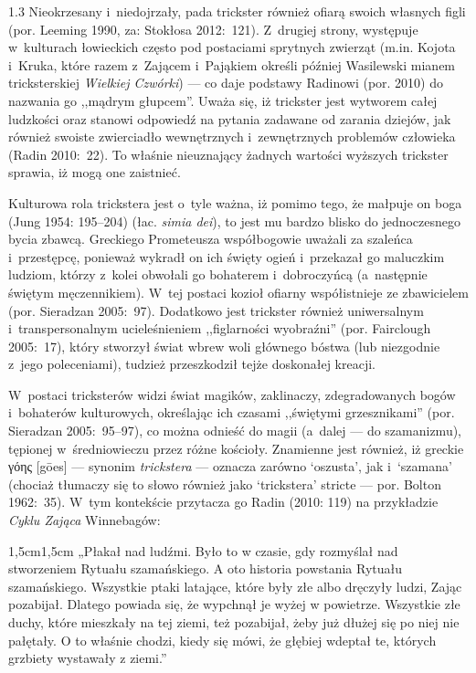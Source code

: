 \documentclass[11pt,a4paper,twoside]{report}
\begin{document}
\begin{spacing}{1.3}
Nieokrzesany i~niedojrzały, pada trickster również ofiarą swoich własnych figli (por. Leeming 1990, za: Stokłosa 2012:~121). Z~drugiej strony, występuje w~kulturach łowieckich często pod postaciami sprytnych zwierząt (m.in. Kojota i~Kruka, które razem z~Zającem i~Pająkiem określi później Wasilewski mianem tricksterskiej \emph{Wielkiej Czwórki}) --- co daje podstawy Radinowi (por. 2010) do nazwania go ,,mądrym głupcem''. Uważa się, iż trickster jest wytworem całej ludzkości oraz stanowi odpowiedź na pytania zadawane od zarania dziejów, jak również swoiste zwierciadło wewnętrznych i~zewnętrznych problemów człowieka (Radin 2010:~22). To właśnie nieuznający żadnych wartości wyższych trickster sprawia, iż mogą one zaistnieć.

Kulturowa rola trickstera jest o~tyle ważna, iż pomimo tego, że małpuje on boga (Jung 1954: 195--204) (łac. \emph{simia dei}), to jest mu bardzo blisko do jednoczesnego bycia zbawcą. Greckiego Prometeusza współbogowie uważali za szaleńca i~przestępcę, ponieważ wykradł on ich święty ogień i~przekazał go maluczkim ludziom, którzy z~kolei obwołali go bohaterem i~dobroczyńcą (a~następnie świętym męczennikiem). W~tej postaci kozioł ofiarny współistnieje ze zbawicielem (por. Sieradzan 2005:~97). Dodatkowo jest trickster również uniwersalnym i~transpersonalnym ucieleśnieniem ,,figlarności wyobraźni'' (por. Fairclough 2005:~17), który stworzył świat wbrew woli głównego bóstwa (lub niezgodnie z~jego poleceniami), tudzież przeszkodził tejże doskonałej kreacji.

W~postaci tricksterów widzi świat magików, zaklinaczy, zdegradowanych bogów i~bohaterów kulturowych, określając ich czasami ,,świętymi grzesznikami'' (por. Sieradzan 2005:~95--97), co można odnieść do magii (a~dalej --- do szamanizmu), tępionej w~średniowieczu przez różne kościoły. Znamienne jest również, iż greckie \textgreek{γόης} [g\={o}es] --- synonim \emph{trickstera} --- oznacza zarówno ‘oszusta’, jak i~‘szamana’ (chociaż tłumaczy się to słowo również jako ‘trickstera’ stricte --- por. Bolton 1962:~35). W~tym kontekście przytacza go Radin (2010: 119) na przykładzie \emph{Cyklu Zająca} Winnebagów:
\end{spacing}
\pagebreak
\begin{adjustwidth}{1,5cm}{1,5cm}
\small{
„Płakał nad ludźmi. Było to w czasie, gdy rozmyślał nad stworzeniem Rytuału szamańskiego. A oto historia powstania Rytuału szamańskiego. Wszystkie ptaki latające, które były złe albo dręczyły ludzi, Zając pozabijał. Dlatego powiada się, że wypchnął je wyżej w powietrze. Wszystkie złe duchy, które mieszkały na tej ziemi, też pozabijał, żeby już dłużej się po niej nie pałętały. O to właśnie chodzi, kiedy się mówi, że głębiej wdeptał te, których grzbiety wystawały z ziemi.”\\
}
\end{adjustwidth}
\end{document}
